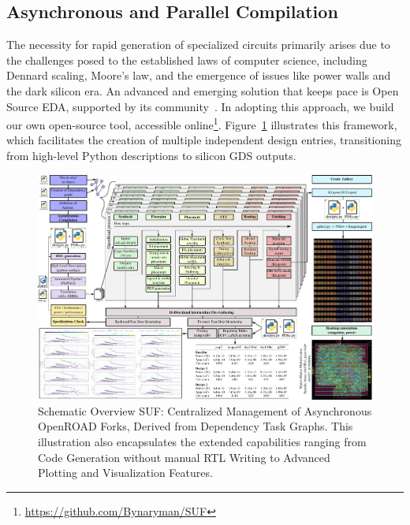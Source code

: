 \subsection{Asynchronous and Parallel Compilation}
\label{sec:framework}

The necessity for rapid generation of specialized circuits primarily arises due to the challenges posed to the established laws of computer science, including Dennard scaling, Moore's law, and the emergence of issues like power walls and the dark silicon era.
An advanced and emerging solution that keeps pace is Open Source EDA, supported by its community~\cite{ajayi2019toward}.
In adopting this approach, we build our own open-source tool, accessible online\footnote{\url{https://github.com/Bynaryman/SUF}}.
Figure~\ref{fig:suf} illustrates this framework, which facilitates the creation of multiple independent design entries, transitioning from high-level Python descriptions to silicon GDS outputs.

\begin{figure}[t]
\centering
	\includegraphics[width=0.9\columnwidth]{./figures/SUF.pdf}
	\vspace{-0.3cm}
	\caption{Schematic Overview SUF: Centralized Management of Asynchronous OpenROAD Forks, Derived from Dependency Task Graphs. This illustration also encapsulates the extended capabilities ranging from Code Generation without manual RTL Writing to Advanced Plotting and Visualization Features.}
	\vspace{-0.3cm}
	\label{fig:suf}
\end{figure}

